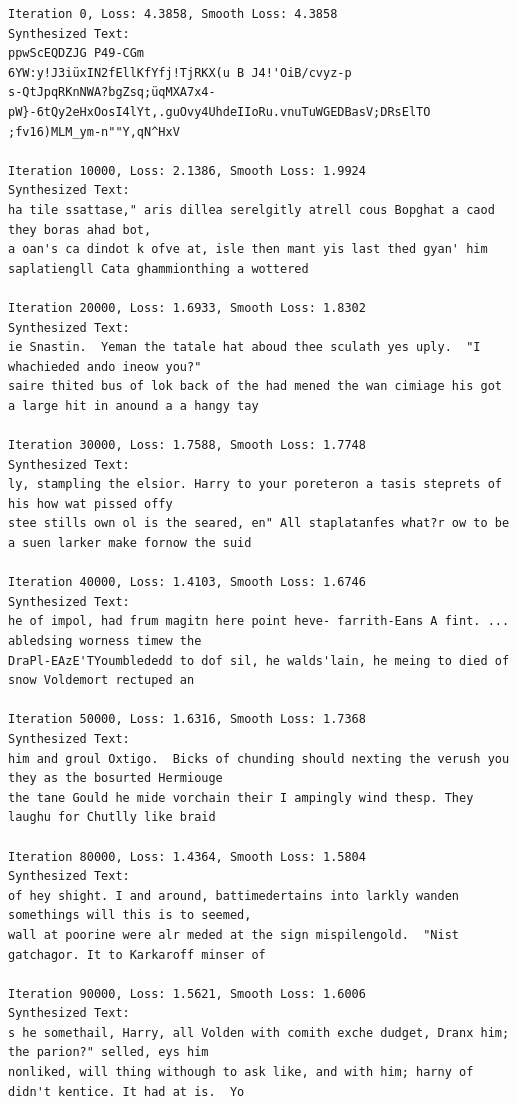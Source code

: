 \documentclass{article}
\begin{document}
\begin{verbatim}
Iteration 0, Loss: 4.3858, Smooth Loss: 4.3858
Synthesized Text:
ppwScEQDZJG P49-CGm
6YW:y!J3iüxIN2fEllKfYfj!TjRKX(u B J4!'OiB/cvyz-p
s-QtJpqRKnNWA?bgZsq;üqMXA7x4-pW}-6tQy2eHxOosI4lYt,.guOvy4UhdeIIoRu.vnuTuWGEDBasV;DRsElTO ;fv16)MLM_ym-n""Y,qN^HxV

Iteration 10000, Loss: 2.1386, Smooth Loss: 1.9924
Synthesized Text:
ha tile ssattase," aris dillea serelgitly atrell cous Bopghat a caod they boras ahad bot, 
a oan's ca dindot k ofve at, isle then mant yis last thed gyan' him saplatiengll Cata ghammionthing a wottered

Iteration 20000, Loss: 1.6933, Smooth Loss: 1.8302
Synthesized Text:
ie Snastin.  Yeman the tatale hat aboud thee sculath yes uply.  "I whachieded ando ineow you?" 
saire thited bus of lok back of the had mened the wan cimiage his got a large hit in anound a a hangy tay

Iteration 30000, Loss: 1.7588, Smooth Loss: 1.7748
Synthesized Text:
ly, stampling the elsior. Harry to your poreteron a tasis steprets of his how wat pissed offy 
stee stills own ol is the seared, en" All staplatanfes what?r ow to be a suen larker make fornow the suid

Iteration 40000, Loss: 1.4103, Smooth Loss: 1.6746
Synthesized Text:
he of impol, had frum magitn here point heve- farrith-Eans A fint. ... abledsing worness timew the 
DraPl-EAzE'TYoumblededd to dof sil, he walds'lain, he meing to died of snow Voldemort rectuped an

Iteration 50000, Loss: 1.6316, Smooth Loss: 1.7368
Synthesized Text:
him and groul Oxtigo.  Bicks of chunding should nexting the verush you they as the bosurted Hermiouge 
the tane Gould he mide vorchain their I ampingly wind thesp. They laughu for Chutlly like braid

Iteration 80000, Loss: 1.4364, Smooth Loss: 1.5804
Synthesized Text:
of hey shight. I and around, battimedertains into larkly wanden somethings will this is to seemed, 
wall at poorine were alr meded at the sign mispilengold.  "Nist gatchagor. It to Karkaroff minser of

Iteration 90000, Loss: 1.5621, Smooth Loss: 1.6006
Synthesized Text:
s he somethail, Harry, all Volden with comith exche dudget, Dranx him; the parion?" selled, eys him 
nonliked, will thing withough to ask like, and with him; harny of didn't kentice. It had at is.  Yo


\end{verbatim}
\end{document}
